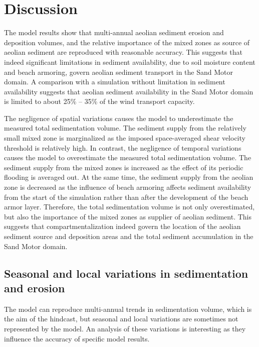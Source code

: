 \section{Discussion}

The model results show that multi-annual aeolian sediment erosion and
deposition volumes, and the relative importance of the mixed zones as
source of aeolian sediment are reproduced with reasonable
accuracy. This suggests that indeed significant limitations in
sediment availability, due to soil moisture content and beach
armoring, govern aeolian sediment transport in the Sand Motor
domain. A comparison with a simulation without limitation in sediment
availability suggests that aeolian sediment availability in the Sand
Motor domain is limited to about 25\% -- 35\% of the wind transport
capacity.

The negligence of spatial variations causes the model to underestimate
the measured total sedimentation volume. The sediment supply from the
relatively small mixed zone is marginalized as the imposed
space-averaged shear velocity threshold is relatively high. In
contrast, the negligence of temporal variations causes the model to
overestimate the measured total sedimentation volume. The sediment
supply from the mixed zones is increased as the effect of its periodic
flooding is averaged out. At the same time, the sediment supply from
the aeolian zone is decreased as the influence of beach armoring
affects sediment availability from the start of the simulation rather
than after the development of the beach armor layer. Therefore, the
total sedimentation volume is not only overestimated, but also the
importance of the mixed zones as supplier of aeolian sediment. This
suggests that compartmentalization indeed govern the location of the
aeolian sediment source and deposition areas and the total sediment
accumulation in the Sand Motor domain.

\subsection{Seasonal and local variations in sedimentation and
  erosion}

The model can reproduce multi-annual trends in sedimentation volume,
which is the aim of the hindcast, but seasonal and local variations
are sometimes not represented by the model. An analysis of these
variations is interesting as they influence the accuracy of specific
model results.

